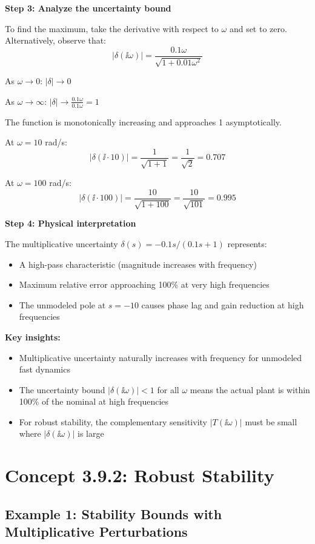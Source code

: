 \documentclass[11pt,a4paper]{article}
\begin{document}
\textbf{Step 3: Analyze the uncertainty bound}

To find the maximum, take the derivative with respect to $\omega$ and set to zero. Alternatively, observe that:
\[
|\delta(\ii\omega)| = \frac{0.1\omega}{\sqrt{1 + 0.01\omega^2}}
\]

As $\omega \to 0$: $|\delta| \to 0$

As $\omega \to \infty$: $|\delta| \to \frac{0.1\omega}{0.1\omega} = 1$

The function is monotonically increasing and approaches 1 asymptotically.

At $\omega = 10$ rad/s:
\[
|\delta(\ii \cdot 10)| = \frac{1}{\sqrt{1 + 1}} = \frac{1}{\sqrt{2}} = 0.707
\]

At $\omega = 100$ rad/s:
\[
|\delta(\ii \cdot 100)| = \frac{10}{\sqrt{1 + 100}} = \frac{10}{\sqrt{101}} = 0.995
\]

\textbf{Step 4: Physical interpretation}

The multiplicative uncertainty $\delta(s) = -0.1s/(0.1s+1)$ represents:
\begin{itemize}
\item A high-pass characteristic (magnitude increases with frequency)
\item Maximum relative error approaching 100\% at very high frequencies
\item The unmodeled pole at $s = -10$ causes phase lag and gain reduction at high frequencies
\end{itemize}

\textbf{Key insights:}
\begin{itemize}
\item Multiplicative uncertainty naturally increases with frequency for unmodeled fast dynamics
\item The uncertainty bound $|\delta(\ii\omega)| < 1$ for all $\omega$ means the actual plant is within 100\% of the nominal at high frequencies
\item For robust stability, the complementary sensitivity $|T(\ii\omega)|$ must be small where $|\delta(\ii\omega)|$ is large
\end{itemize}

\section{Concept 3.9.2: Robust Stability}

\subsection{Example 1: Stability Bounds with Multiplicative Perturbations}
\end{document}
